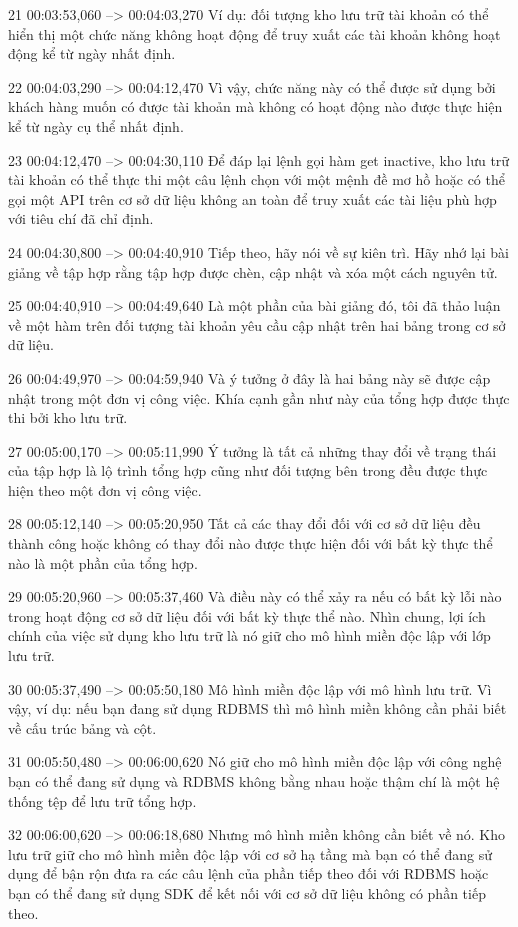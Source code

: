 21
00:03:53,060 --> 00:04:03,270
Ví dụ: đối tượng kho lưu trữ tài khoản có thể hiển thị một chức năng không hoạt động để truy xuất các tài khoản không hoạt động kể từ ngày nhất định.

22
00:04:03,290 --> 00:04:12,470
Vì vậy, chức năng này có thể được sử dụng bởi khách hàng muốn có được tài khoản mà không có hoạt động nào được thực hiện kể từ ngày cụ thể nhất định.

23
00:04:12,470 --> 00:04:30,110
Để đáp lại lệnh gọi hàm get inactive, kho lưu trữ tài khoản có thể thực thi một câu lệnh chọn với một mệnh đề mơ hồ hoặc có thể gọi một API trên cơ sở dữ liệu không an toàn để truy xuất các tài liệu phù hợp với tiêu chí đã chỉ định.

24
00:04:30,800 --> 00:04:40,910
Tiếp theo, hãy nói về sự kiên trì.  Hãy nhớ lại bài giảng về tập hợp rằng tập hợp được chèn, cập nhật và xóa một cách nguyên tử.

25
00:04:40,910 --> 00:04:49,640
Là một phần của bài giảng đó, tôi đã thảo luận về một hàm trên đối tượng tài khoản yêu cầu cập nhật trên hai bảng trong cơ sở dữ liệu.

26
00:04:49,970 --> 00:04:59,940
Và ý tưởng ở đây là hai bảng này sẽ được cập nhật trong một đơn vị công việc.  Khía cạnh gần như này của tổng hợp được thực thi bởi kho lưu trữ.

27
00:05:00,170 --> 00:05:11,990
Ý tưởng là tất cả những thay đổi về trạng thái của tập hợp là lộ trình tổng hợp cũng như đối tượng bên trong đều được thực hiện theo một đơn vị công việc.

28
00:05:12,140 --> 00:05:20,950
Tất cả các thay đổi đối với cơ sở dữ liệu đều thành công hoặc không có thay đổi nào được thực hiện đối với bất kỳ thực thể nào là một phần của tổng hợp.

29
00:05:20,960 --> 00:05:37,460
Và điều này có thể xảy ra nếu có bất kỳ lỗi nào trong hoạt động cơ sở dữ liệu đối với bất kỳ thực thể nào.  Nhìn chung, lợi ích chính của việc sử dụng kho lưu trữ là nó giữ cho mô hình miền độc lập với lớp lưu trữ.

30
00:05:37,490 --> 00:05:50,180
Mô hình miền độc lập với mô hình lưu trữ.  Vì vậy, ví dụ: nếu bạn đang sử dụng RDBMS thì mô hình miền không cần phải biết về cấu trúc bảng và cột.

31
00:05:50,480 --> 00:06:00,620
Nó giữ cho mô hình miền độc lập với công nghệ bạn có thể đang sử dụng và RDBMS không bằng nhau hoặc thậm chí là một hệ thống tệp để lưu trữ tổng hợp.

32
00:06:00,620 --> 00:06:18,680
Nhưng mô hình miền không cần biết về nó.  Kho lưu trữ giữ cho mô hình miền độc lập với cơ sở hạ tầng mà bạn có thể đang sử dụng để bận rộn đưa ra các câu lệnh của phần tiếp theo đối với RDBMS hoặc bạn có thể đang sử dụng SDK để kết nối với cơ sở dữ liệu không có phần tiếp theo.

